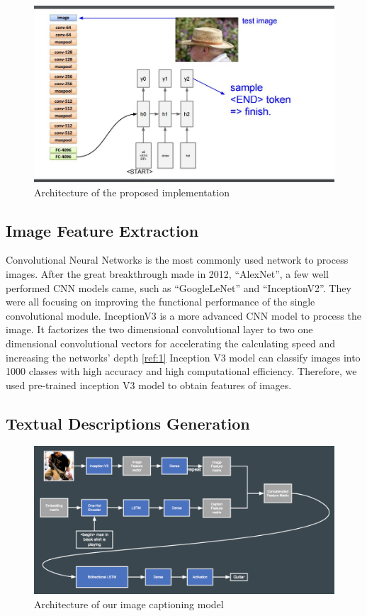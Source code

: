 \documentclass{article}
\begin{document}
\begin{figure}[!ht]
\centering
\includegraphics[scale=0.30]{1.png}
\caption{Architecture of the proposed implementation}
\label{fig:1}
\end{figure}

\subsection{Image Feature Extraction}

Convolutional Neural Networks is the most commonly used network to process images. After the great breakthrough made in 2012, “AlexNet”, a few well performed CNN models came, such as “GoogleLeNet” and “InceptionV2”. They were all focusing on improving the functional performance of the single convolutional module.  InceptionV3 is a more advanced CNN model to process the image. It factorizes the two dimensional convolutional layer to two one dimensional convolutional vectors for accelerating the calculating speed and increasing the networks’ depth \ref{ref:1}
	Inception V3 model can classify images into 1000 classes with high accuracy and high computational efficiency. Therefore, we used pre-trained inception V3 model to obtain features of images.

\subsection{Textual Descriptions Generation}
\begin{figure}[!ht]
\centering
\includegraphics[scale=0.26]{2.png}
\caption{Architecture of our image captioning model}
\label{fig:2}
\end{figure}
\end{document}
